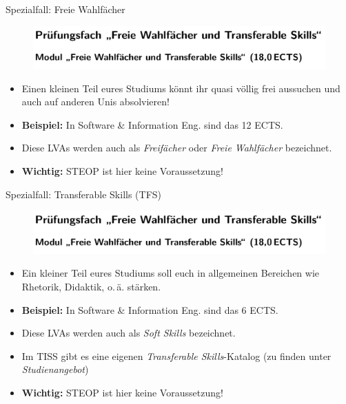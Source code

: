 \documentclass{beamer}
\begin{document}
\begin{frame}{Spezialfall: Freie Wahlfächer}
    \begin{figure}[htp]
        \includegraphics[width=1.0\textwidth]{pruefungsfach3.png}
    \end{figure}
    \begin{itemize}
        \item Einen kleinen Teil eures Studiums könnt ihr quasi völlig frei
              aussuchen und auch auf anderen Unis absolvieren!
        \item \textbf{Beispiel:} In Software \& Information Eng. sind das 12 ECTS.
        \item Diese LVAs werden auch als \textit{Freifächer} oder
              \textit{Freie Wahlfächer} bezeichnet.
        \item \textbf{Wichtig:} STEOP ist hier keine Voraussetzung!
    \end{itemize}
\end{frame}

\begin{frame}{Spezialfall: Transferable Skills (TFS)}
    \begin{figure}[htp]
        \includegraphics[width=1.0\textwidth]{pruefungsfach3.png}
    \end{figure}
    \begin{itemize}
        \item Ein kleiner Teil eures Studiums soll euch in allgemeinen
              Bereichen wie Rhetorik, Didaktik, o.\,ä. stärken.
        \item \textbf{Beispiel:} In Software \& Information Eng. sind das 6 ECTS.
        \item Diese LVAs werden auch als \textit{Soft Skills} bezeichnet.
        \item Im TISS gibt es eine eigenen \textit{Transferable
              Skills}-Katalog (zu finden unter \textit{Studienangebot})
        \item \textbf{Wichtig:} STEOP ist hier keine Voraussetzung!
    \end{itemize}
\end{frame}
\end{document}
